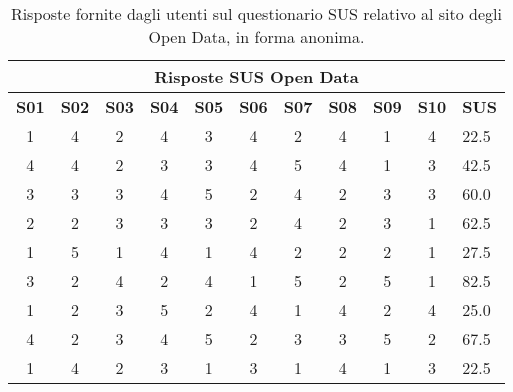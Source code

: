 \begin{center}
    \begin{table}[H]
        \centering
        \begin{tabularx}{\textwidth}{|c|c|c|c|c|c|c|c|c|c|X|}
            \hline
            \multicolumn{11}{|c|}{\textbf{Risposte SUS Open Data}} \\
            \hline
            \textbf{S01} & \textbf{S02} & \textbf{S03} & \textbf{S04} & \textbf{S05} & \textbf{S06} & \textbf{S07} & \textbf{S08} & \textbf{S09} & \textbf{S10} & \textbf{SUS} \\
            \hline
            1 & 4 & 2 & 4 & 3 & 4 & 2 & 4 & 1 & 4 & 22.5 \\
            4 & 4 & 2 & 3 & 3 & 4 & 5 & 4 & 1 & 3 & 42.5 \\
            3 & 3 & 3 & 4 & 5 & 2 & 4 & 2 & 3 & 3 & 60.0 \\
            2 & 2 & 3 & 3 & 3 & 2 & 4 & 2 & 3 & 1 & 62.5 \\
            1 & 5 & 1 & 4 & 1 & 4 & 2 & 2 & 2 & 1 & 27.5 \\
            3 & 2 & 4 & 2 & 4 & 1 & 5 & 2 & 5 & 1 & 82.5 \\
            1 & 2 & 3 & 5 & 2 & 4 & 1 & 4 & 2 & 4 & 25.0 \\
            4 & 2 & 3 & 4 & 5 & 2 & 3 & 3 & 5 & 2 & 67.5 \\
            1 & 4 & 2 & 3 & 1 & 3 & 1 & 4 & 1 & 3 & 22.5 \\
            \hline
        \end{tabularx}
        \caption[Risposte del questionario SUS sul sito degli Open Data]{Risposte fornite dagli utenti sul questionario SUS relativo al sito degli Open Data, in forma anonima.}
        \label{tab:sus_opendata}
    \end{table}
\end{center}

